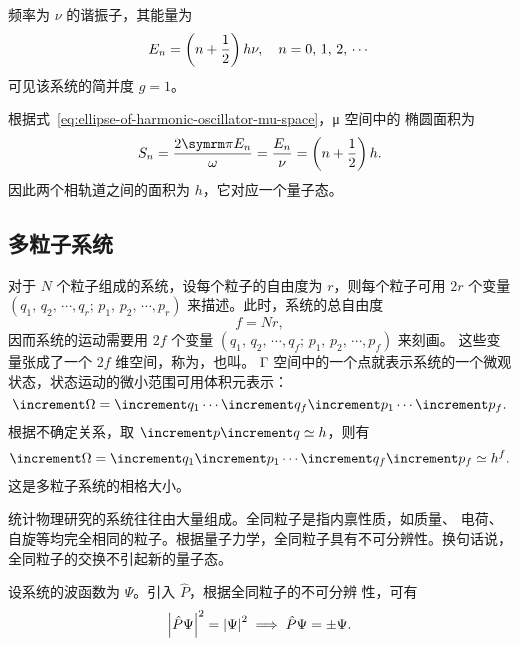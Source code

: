 \begin{example}[一维谐振子]
  频率为 $\nu$ 的谐振子，其能量为
  \begin{equation}
    E_n = \qty(n+\frac{1}{2}) \, h\nu \qc n = 0, \, 1, \, 2, \, \cdots
  \end{equation}
  可见该系统的简并度 $g=1$。

  根据式~\eqref{eq:ellipse-of-harmonic-oscillator-mu-space}，μ 空间中的
  椭圆面积为
  \begin{equation}
    S_n = \frac{2\pp E_n}{\omega} =\frac{E_n}{\nu} = \qty(n+\frac{1}{2}) \, h.
  \end{equation}
  因此两个相轨道之间的面积为 $h$，它对应一个量子态。
\end{example}

\begin{example}[转子]
\end{example}

\subsection{多粒子系统}

对于 $N$ 个粒子组成的系统，设每个粒子的自由度为 $r$，则每个粒子可用 $2r$ 个变量
$(q_1, \, q_2, \, \cdots, q_r; \, \allowbreak p_1, \, p_2, \, \cdots, p_r)$
来描述。此时，系统的总自由度
\begin{equation}
  f = Nr,
\end{equation}
因而系统的运动需要用 $2f$ 个变量
$(q_1, \, q_2, \, \cdots, q_f; \, p_1, \, p_2, \, \cdots, p_f)$ 来刻画。
这些变量张成了一个 $2f$ 维空间，称为，也叫。
Γ 空间中的一个点就表示系统的一个微观状态，状态运动的微小范围可用体积元表示：
\begin{equation}
  \incr{\Omega} = \incr{q_1} \cdots \incr{q_f} \incr{p_1} \cdots \incr{p_f}.
\end{equation}
根据不确定关系，取 $\incr{p} \incr{q} \simeq h$，则有
\begin{equation}
  \incr{\Omega} = \incr{q_1} \incr{p_1} \cdots \incr{q_f} \incr{p_f} \simeq h^f.
\end{equation}
这是多粒子系统的相格大小。

统计物理研究的系统往往由大量组成。全同粒子是指内禀性质，如质量、
电荷、自旋等均完全相同的粒子。根据量子力学，全同粒子具有不可分辨性。换句话说，
全同粒子的交换不引起新的量子态。

设系统的波函数为 $\Psi$。引入 $\hat{P}$，根据全同粒子的不可分辨
性，可有
\begin{equation}
  \abs{\hat{P}\Psi}^2 = \abs{\Psi}^2 \implies \hat{P}\Psi = \pm\Psi.
\end{equation}

